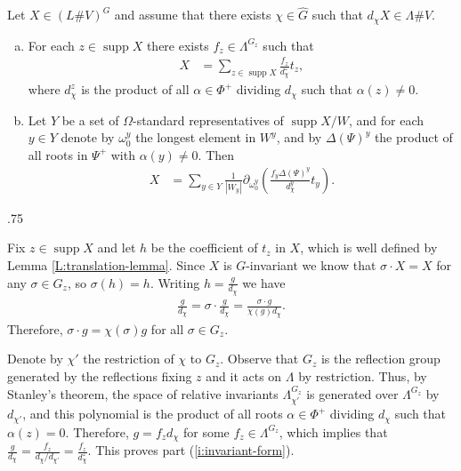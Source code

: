 \documentclass[11pt,fleqn]{amsart}
\makeatletter
\renewcommand\proofname{Proof}
\renewenvironment{proof}[1][\textit{\proofname}]{\par
 \pushQED{\qed}%
 \normalfont \topsep.75\paraskip\relax
 \trivlist
 \item[\hskip\labelsep
 \itshape
 #1\@addpunct{.}]\ignorespaces
}{%
 \popQED\endtrivlist\@endpefalse
}
\newcounter{para}[section]
\DeclareMathOperator\supp{supp}
\makeatother
\begin{document}
\begin{Proposition}
\label{P:form}
Let $X \in (L \#V)^G$ and assume that there exists $\chi \in \hat G$ such that 
$d_\chi X \in \Lambda \# V$. 
\begin{enumerate}[(a)]
\item 
\label{i:invariant-form}
For each $z \in \supp X$ there exists $f_z \in \Lambda^{G_z}$ such that
\begin{align*}
X
	&= \sum_{z \in \supp X} \frac{f_z}{d_{\chi}^z} t_z,
\end{align*}
where $d_{\chi}^z$ is the product of all $\alpha \in \Phi^+$ dividing $d_\chi$ 
such that $\alpha(z) \neq 0$. 

\item
\label{i:dd-form}
Let $Y$ be a set of $\Omega$-standard representatives of $\supp X / W$, and 
for each $y \in Y$ denote by $\omega_0^y$ the longest element in $W^y$, and by 
$\Delta(\Psi)^y$ the product of all roots in $\Psi^+$ with $\alpha(y) 
\neq 0$. Then 
\begin{align*}
X
	&= \sum_{y \in Y} \frac{1}{|W_y|}
		\partial_{\omega_0^{y}}\left(
			\frac{f_y \Delta(\Psi)^y}{d_{\chi}^y} t_y
		\right).
\end{align*}
\end{enumerate}
\begin{proof}
Fix $z \in \supp X$ and let $h$ be the coefficient of $t_z$ in $X$, which is 
well defined by Lemma \ref{L:translation-lemma}. Since $X$ is $G$-invariant we 
know that $\sigma \cdot X = X$ for any $\sigma \in G_z$, so $\sigma(h) = h$. 
Writing $h = \frac{g}{d_\chi}$ we have
\begin{align*}
\frac{g}{d_\chi} 
	= \sigma \cdot \frac{g}{d_\chi} 
	=\frac{\sigma \cdot g}{\chi(g) d_\chi}.
\end{align*}
Therefore, $\sigma \cdot g = \chi(\sigma) g$ for all $\sigma \in G_z$. 

Denote by $\chi'$ the restriction of $\chi$ to $G_z$. Observe that $G_z$ is the 
reflection group generated by the reflections fixing $z$ and it acts on 
$\Lambda$ by restriction. Thus,  by Stanley's theorem, the space of relative 
invariants $\Lambda^{G_z}_{\chi'}$ is generated over $\Lambda^{G_z}$ by 
$d_{\chi'}$, and this polynomial is the product of all roots $\alpha \in 
\Phi^+$ dividing $d_\chi$ such that $\alpha(z) = 0$. Therefore, $g = f_z d_{\chi}$
for some $f_z \in \Lambda^{G_z}$, which implies that $\frac{g}{d_{\chi}} = 
\frac{f_z}{d_\chi/d_{\chi'}} = \frac{f_z}{d_{\chi}^z}$. This proves part 
(\ref{i:invariant-form}). 


\end{proof}
\end{Proposition}
\end{document}
